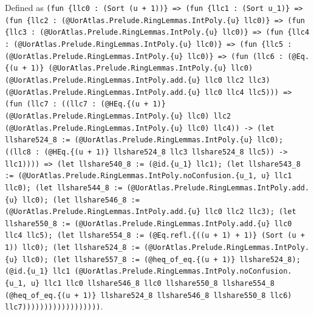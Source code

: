\documentclass[11pt]{article}
\begin{document}
\noindent Defined as \texttt{(fun \{llc0 : (Sort (u + 1))\} => (fun \{llc1 : (Sort u\_1)\} => (fun \{llc2 : (@UorAtlas.Prelude.RingLemmas.IntPoly.\{u\} llc0)\} => (fun \{llc3 : (@UorAtlas.Prelude.RingLemmas.IntPoly.\{u\} llc0)\} => (fun \{llc4 : (@UorAtlas.Prelude.RingLemmas.IntPoly.\{u\} llc0)\} => (fun \{llc5 : (@UorAtlas.Prelude.RingLemmas.IntPoly.\{u\} llc0)\} => (fun (llc6 : (@Eq.\{(u + 1)\} (@UorAtlas.Prelude.RingLemmas.IntPoly.\{u\} llc0) (@UorAtlas.Prelude.RingLemmas.IntPoly.add.\{u\} llc0 llc2 llc3) (@UorAtlas.Prelude.RingLemmas.IntPoly.add.\{u\} llc0 llc4 llc5))) => (fun (llc7 : ((llc7 : (@HEq.\{(u + 1)\} (@UorAtlas.Prelude.RingLemmas.IntPoly.\{u\} llc0) llc2 (@UorAtlas.Prelude.RingLemmas.IntPoly.\{u\} llc0) llc4)) -> (let llshare524\_8 := (@UorAtlas.Prelude.RingLemmas.IntPoly.\{u\} llc0); ((llc8 : (@HEq.\{(u + 1)\} llshare524\_8 llc3 llshare524\_8 llc5)) -> llc1)))) => (let llshare540\_8 := (@id.\{u\_1\} llc1); (let llshare543\_8 := (@UorAtlas.Prelude.RingLemmas.IntPoly.noConfusion.\{u\_1, u\} llc1 llc0); (let llshare544\_8 := (@UorAtlas.Prelude.RingLemmas.IntPoly.add.\{u\} llc0); (let llshare546\_8 := (@UorAtlas.Prelude.RingLemmas.IntPoly.add.\{u\} llc0 llc2 llc3); (let llshare550\_8 := (@UorAtlas.Prelude.RingLemmas.IntPoly.add.\{u\} llc0 llc4 llc5); (let llshare554\_8 := (@Eq.refl.\{((u + 1) + 1)\} (Sort (u + 1)) llc0); (let llshare524\_8 := (@UorAtlas.Prelude.RingLemmas.IntPoly.\{u\} llc0); (let llshare557\_8 := (@heq\_of\_eq.\{(u + 1)\} llshare524\_8); (@id.\{u\_1\} llc1 (@UorAtlas.Prelude.RingLemmas.IntPoly.noConfusion.\{u\_1, u\} llc1 llc0 llshare546\_8 llc0 llshare550\_8 llshare554\_8 (@heq\_of\_eq.\{(u + 1)\} llshare524\_8 llshare546\_8 llshare550\_8 llc6) llc7))))))))))))))))))}.\par
\end{document}

